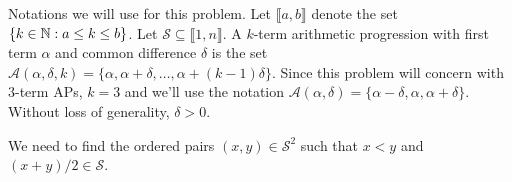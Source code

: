 Notations we will use for this problem. Let $\lBrack a,b\rBrack$ denote the set $\{k\in \mathbb{N} : a\leq k\leq b\}$. Let $\mathcal{S}\subseteq \lBrack 1,n\rBrack$. A $k$-term arithmetic progression with first term $\alpha$ and common difference $\delta$ is the set $\mathcal{A}(\alpha,\delta,k) = \{\alpha, \alpha+\delta, \ldots, \alpha+(k-1)\delta\}$. Since this problem will concern with $3$-term APs, $k=3$ and we'll use the notation $\mathcal{A}(\alpha,\delta) = \{\alpha-\delta, \alpha,\alpha+\delta\}$. Without loss of generality, $\delta>0$.

We need to find the ordered pairs $(x,y)\in \mathcal{S}^2$ such that $x<y$ and $(x+y)/2\in \mathcal{S}$. 








